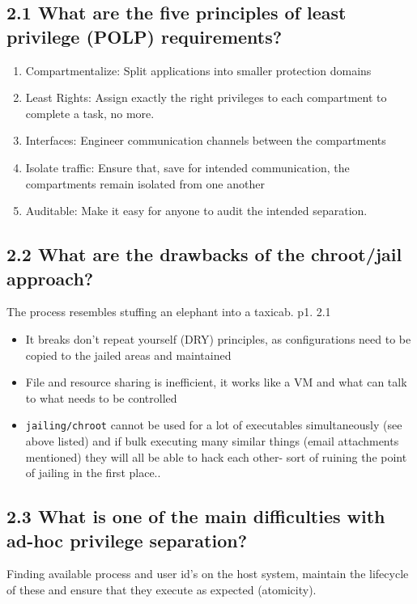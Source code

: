 \documentclass[
	letterpaper, %
	10pt, %
	unnumberedsections, %
	twoside, %
]{LTJournalArticle}
\begin{document}
\subsection{2.1 What are the five principles of least privilege (POLP) requirements?}
\begin{enumerate}
	\item Compartmentalize: Split applications into smaller protection domains
	\item Least Rights: Assign exactly the right privileges to each compartment to complete a task, no more.
	\item Interfaces: Engineer communication channels between the compartments
	\item Isolate traffic: Ensure that, save for intended communication, the compartments remain isolated from one another
	\item Auditable: Make it easy for anyone to audit the intended separation.
\end{enumerate}

\subsection{2.2 What are the drawbacks of the chroot/jail approach?}
The process resembles stuffing an elephant into a taxicab.\cite{LeastPriv} p1. 2.1
\begin{itemize}
	\item It breaks don't repeat yourself (DRY) principles, as configurations need to be copied to the jailed areas and maintained
	\item File and resource sharing is inefficient, it works like a VM and what can talk to what needs to be controlled
	\item \texttt{jailing/chroot} cannot be used for a lot of executables simultaneously (see above listed) and if bulk executing many similar things (email attachments mentioned) they will all be able to hack each other- sort of ruining the point of jailing in the first place..      
\end{itemize}

\subsection{2.3 What is one of the main difficulties with ad-hoc privilege separation?}
Finding available process and user id's on the host system, maintain the lifecycle of these and ensure that they execute as expected (atomicity).
\end{document}
